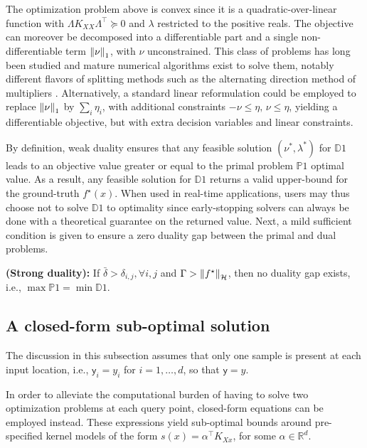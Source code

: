 The optimization problem above is convex since it is a quadratic-over-linear function with $\Lambda K_{XX} \Lambda^\top \succeq 0$ and $\lambda$ restricted to the positive reals. The objective can moreover be decomposed into a differentiable part and a single non-differentiable term $\left\| \nu \right\|_1$, with $\nu$ unconstrained. This class of problems has long been studied and mature numerical algorithms exist to solve them, notably different flavors of splitting methods such as the alternating direction method of multipliers \cite[§6]{boyd2011distributed}. Alternatively, a standard linear reformulation could be employed to replace $\left\| \nu \right\|_1$ by $\sum_i \eta_i$, with additional constraints $-\nu \leq \eta, \, \nu \leq \eta$, yielding a differentiable objective, but with extra decision variables and linear constraints. 

By definition, weak duality \citep[§5]{bertsekas2009convex} ensures that any feasible solution $(\nu^*,\lambda^*)$ for $\mathds{D}1$ leads to an objective value greater or equal to the primal problem $\mathds{P}1$ optimal value. As a result, any feasible solution for $\mathds{D}1$ returns a valid upper-bound for the ground-truth  $f^\star(x)$. When used in real-time applications, users may thus choose not to solve $\mathds{D}1$ to optimality since early-stopping solvers can always be done with a theoretical guarantee on the returned value. Next, a mild sufficient condition is given to ensure a zero duality gap between the primal and dual problems.

\begin{proposition}
	\label{prop.strong_duality}
	{\normalfont \textbf{(Strong duality):}}
	If $\bar \delta > \delta_{i,j}, \forall i, j$ and $\Gamma > \left\| f^\star \right\|_\mathcal{H}$, then no duality gap exists, i.e., $\max \mathds{P}1 = \min \mathds{D}1$.
\end{proposition}


\subsection{A closed-form sub-optimal solution}

The discussion in this subsection assumes that only one sample is present at each input location, i.e., $\mathsf{y}_i = y_i$ for $i=1,\dots,d $, so that $\mathsf{y}=y$.

In order to alleviate the computational burden of having to solve two optimization problems at each query point, closed-form equations can be employed instead. These expressions yield sub-optimal bounds around pre-specified kernel models of the form $s(x) = \alpha^\top K_{Xx}$, for some $\alpha \in \mathbb{R}^d$. 

